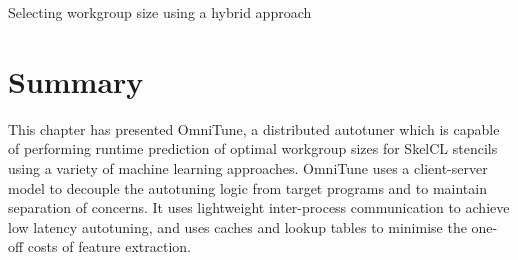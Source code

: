 
\begin{algorithm}

\caption{Selecting workgroup size using a hybrid approach}
\label{alg:autotune-hybrid}
\end{algorithm}

\section{Summary}

This chapter has presented OmniTune, a distributed autotuner which is
capable of performing runtime prediction of optimal workgroup sizes
for SkelCL stencils using a variety of machine learning
approaches. OmniTune uses a client-server model to decouple the
autotuning logic from target programs and to maintain separation of
concerns. It uses lightweight inter-process communication to achieve
low latency autotuning, and uses caches and lookup tables to minimise
the one-off costs of feature extraction.

